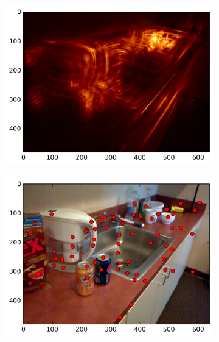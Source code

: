 \begin{figure}[ht]
\begin{subfigure}[]{0.25\linewidth}\label{fig:kit_smag_3}\includegraphics[width=\linewidth]{figures/kitchen_smag_7}\end{subfigure}%
\begin{subfigure}[]{0.25\linewidth}\label{fig:kit_feats_3}\includegraphics[width=\linewidth]{figures/kitchen_feats_7}\end{subfigure}%

\end{figure}

